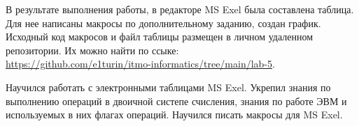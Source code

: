 
\Chapter{\lab\ \labnumber}{\labtheme}
В результате выполнения работы, в редакторе MS Exel была составлена таблица. Для нее написаны макросы по дополнительному заданию, создан график. \\
Исходный код макросов и файл таблицы размещен в личном удаленном репозитории. Их можно найти по ссыке: \\\url{https://github.com/e1turin/itmo-informatics/tree/main/lab-5}.

Научился работать с электронными таблицами MS Exel. Укрепил знания по выполнению операций в двоичной систепе счисления, знания по работе ЭВМ и используемых в них флагах операций. Научился писать макросы для MS Exel.\\
\newpage


 



